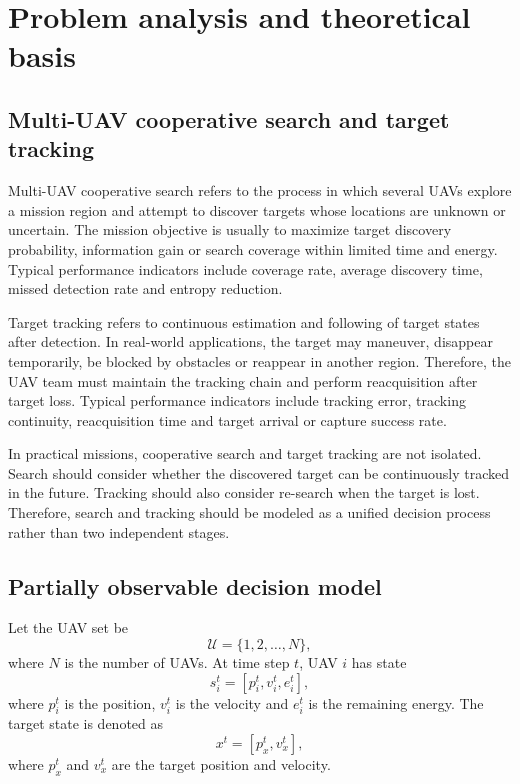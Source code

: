 \documentclass[14pt,a4paper]{extarticle}
\begin{document}
\clearpage

\section{Problem analysis and theoretical basis}

\subsection{Multi-UAV cooperative search and target tracking}

Multi-UAV cooperative search refers to the process in which several UAVs explore a mission region and attempt to discover targets whose locations are unknown or uncertain. The mission objective is usually to maximize target discovery probability, information gain or search coverage within limited time and energy. Typical performance indicators include coverage rate, average discovery time, missed detection rate and entropy reduction.

Target tracking refers to continuous estimation and following of target states after detection. In real-world applications, the target may maneuver, disappear temporarily, be blocked by obstacles or reappear in another region. Therefore, the UAV team must maintain the tracking chain and perform reacquisition after target loss. Typical performance indicators include tracking error, tracking continuity, reacquisition time and target arrival or capture success rate.

In practical missions, cooperative search and target tracking are not isolated. Search should consider whether the discovered target can be continuously tracked in the future. Tracking should also consider re-search when the target is lost. Therefore, search and tracking should be modeled as a unified decision process rather than two independent stages.

\subsection{Partially observable decision model}

Let the UAV set be
\[
\mathcal{U}=\{1,2,\ldots,N\},
\]
where $N$ is the number of UAVs. At time step $t$, UAV $i$ has state
\[
s_i^t=[p_i^t,v_i^t,e_i^t],
\]
where $p_i^t$ is the position, $v_i^t$ is the velocity and $e_i^t$ is the remaining energy. The target state is denoted as
\[
x^t=[p_x^t,v_x^t],
\]
where $p_x^t$ and $v_x^t$ are the target position and velocity.
\end{document}
